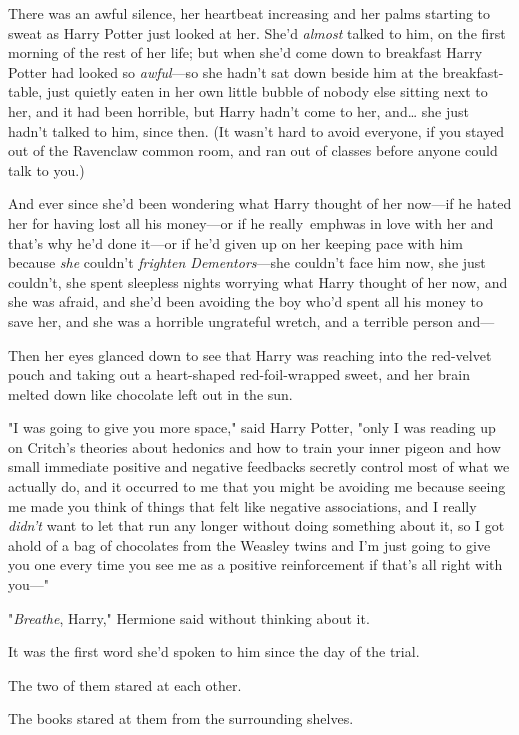 There was an awful silence, her heartbeat increasing and her palms starting to 
sweat as Harry Potter just looked at her. She'd \emph{almost} talked to him, on 
the first morning of the rest of her life; but when she'd come down to 
breakfast Harry Potter had looked so \emph{awful}---so she hadn't sat down 
beside him at the breakfast-table, just quietly eaten in her own little bubble 
of nobody else sitting next to her, and it had been horrible, but Harry hadn't 
come to her, and{\ldots} she just hadn't talked to him, since then. (It wasn't 
hard to avoid everyone, if you stayed out of the Ravenclaw common room, and ran 
out of classes before anyone could talk to you.)

And ever since she'd been wondering what Harry thought of her now---if he hated 
her for having lost all his money---or if he really\ emph{was} in love with her 
and that's why he'd done it---or if he'd given up on her keeping pace with him 
because \emph{she} couldn't \emph{frighten Dementors}---she couldn't face him 
now, she just couldn't, she spent sleepless nights worrying what Harry thought 
of her now, and she was afraid, and she'd been avoiding the boy who'd spent all 
his money to save her, and she was a horrible ungrateful wretch, and a terrible 
person and---

Then her eyes glanced down to see that Harry was reaching into the red-velvet 
pouch and taking out a heart-shaped red-foil-wrapped sweet, and her brain 
melted down like chocolate left out in the sun.

"I was going to give you more space," said Harry Potter, "only I was reading up 
on Critch's theories about hedonics and how to train your inner pigeon and how 
small immediate positive and negative feedbacks secretly control most of what 
we actually do, and it occurred to me that you might be avoiding me because 
seeing me made you think of things that felt like negative associations, and I 
really \emph{didn't} want to let that run any longer without doing something 
about it, so I got ahold of a bag of chocolates from the Weasley twins and I'm 
just going to give you one every time you see me as a positive reinforcement if 
that's all right with you---"

"\emph{Breathe}, Harry," Hermione said without thinking about it.

It was the first word she'd spoken to him since the day of the trial.

The two of them stared at each other.

The books stared at them from the surrounding shelves.

